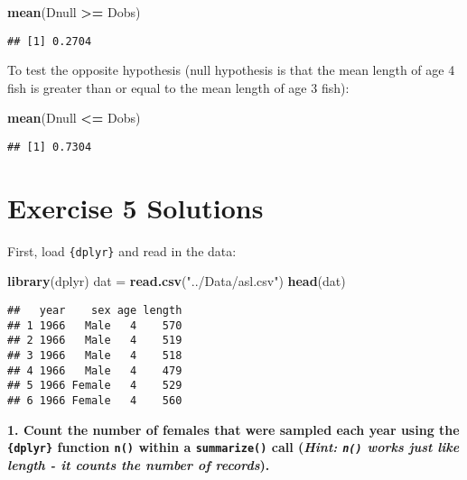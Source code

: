 \documentclass[]{book}
\newenvironment{Shaded}{\begin{snugshade}}{\end{snugshade}}
\newcommand{\KeywordTok}[1]{\textcolor[rgb]{0.13,0.29,0.53}{\textbf{#1}}}
\newcommand{\StringTok}[1]{\textcolor[rgb]{0.31,0.60,0.02}{#1}}
\newcommand{\OperatorTok}[1]{\textcolor[rgb]{0.81,0.36,0.00}{\textbf{#1}}}
\newcommand{\NormalTok}[1]{#1}
\theoremstyle{definition}
\theoremstyle{definition}
\theoremstyle{definition}
\theoremstyle{remark}
\begin{document}
\begin{Shaded}
\begin{Highlighting}[]
\KeywordTok{mean}\NormalTok{(Dnull }\OperatorTok{>=}\StringTok{ }\NormalTok{Dobs)}
\end{Highlighting}
\end{Shaded}

\begin{verbatim}
## [1] 0.2704
\end{verbatim}

To test the opposite hypothesis (null hypothesis is that the mean length
of age 4 fish is greater than or equal to the mean length of age 3
fish):

\begin{Shaded}
\begin{Highlighting}[]
\KeywordTok{mean}\NormalTok{(Dnull }\OperatorTok{<=}\StringTok{ }\NormalTok{Dobs)}
\end{Highlighting}
\end{Shaded}

\begin{verbatim}
## [1] 0.7304
\end{verbatim}

\hypertarget{ex5-answers}{\section*{Exercise 5
Solutions}\label{ex5-answers}}

First, load \texttt{\{dplyr\}} and read in the data:

\begin{Shaded}
\begin{Highlighting}[]
\KeywordTok{library}\NormalTok{(dplyr)}
\NormalTok{dat =}\StringTok{ }\KeywordTok{read.csv}\NormalTok{(}\StringTok{"../Data/asl.csv"}\NormalTok{)}
\KeywordTok{head}\NormalTok{(dat)}
\end{Highlighting}
\end{Shaded}

\begin{verbatim}
##   year    sex age length
## 1 1966   Male   4    570
## 2 1966   Male   4    519
## 3 1966   Male   4    518
## 4 1966   Male   4    479
## 5 1966 Female   4    529
## 6 1966 Female   4    560
\end{verbatim}

\textbf{1. Count the number of females that were sampled each year using
the \texttt{\{dplyr\}} function \texttt{n()} within a
\texttt{summarize()} call (\emph{Hint: \texttt{n()} works just like
length - it counts the number of records}).}
\end{document}
